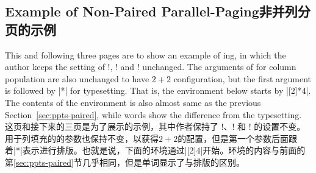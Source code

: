 \newpage
\subsection{Example of Non-Paired Parallel-Paging\hfill 非并列分页的示例}
\label{sec:ppts-npaired}
\begin{paracol}{2}
This and following three pages are to show an example of \npaired{}
\parapag{}ing, in which the author keeps the setting of \!\twosided!,
\!\columnratio! and \!\marginparthreshold! unchanged.
The arguments of \beginparacol{} for column population are also unchanged
to have $2+2$ configuration, but the first argument is followed by |*| for
\npaired{} typesetting.  That is, the environment below starts by
\beginparacol|[2]*{4}|.  The contents of the environment is also almost
same as the previous Section~\ref{sec:ppts-paired}, while
 words show the difference from the \paired{}
typesetting.
\switchcolumn
这页和接下来的三页是为了展示\npaired{}\parapag{}的示例，其中作者保持了 \!\twosided!、\!\columnratio! 和 \!\marginparthreshold! 的设置不变。用于列填充的\beginparacol{}的参数也保持不变，以获得$2+2$的配置，但是第一个参数后面跟着|*|表示进行\npaired{}排版。也就是说，下面的环境通过\beginparacol|[2]{4}|开始。环境的内容与前面的第\ref{sec:ppts-paired}节几乎相同，但是单词显示了与\paired{}排版的区别。    
\end{paracol}

